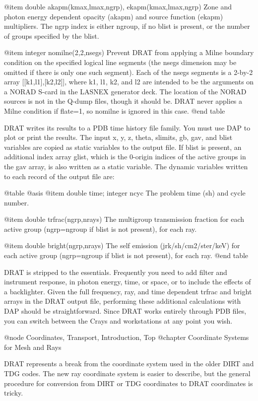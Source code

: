 @item double akapm(kmax,lmax,ngrp), ekapm(kmax,lmax,ngrp)
Zone and photon energy dependent opacity (akapm) and source
function (ekapm) multipliers.  The ngrp index is either
ngroup, if no blist is present, or the number of groups
specified by the blist.

@item integer nomilne(2,2,nsegs)
Prevent DRAT from applying a Milne boundary condition on
the specified logical line segments (the nsegs dimension
may be omitted if there is only one such segment).  Each
of the nsegs segments is a 2-by-2 array [[k1,l1],[k2,l2]],
where k1, l1, k2, and l2 are intended to be the arguments
on a NORAD S-card in the LASNEX generator deck.  The
location of the NORAD sources is not in the Q-dump files,
though it should be.  DRAT never applies a Milne condition
if flate=1, so nomilne is ignored in this case.
@end table

DRAT writes its results to a PDB time history file family.  You must use
DAP to plot or print the results.  The input x, y, z, theta, slimits,
gb, gav, and blist variables are copied as static variables to the
output file.  If blist is present, an additional index array glist,
which is the 0-origin indices of the active groups in the gav array, is
also written as a static variable.  The dynamic variables written to
each record of the output file are:

@table @asis
@item double time; integer ncyc
The problem time (sh) and cycle number.

@item double trfrac(ngrp,nrays)
The multigroup transmission fraction for each active group
(ngrp=ngroup if blist is not present), for each ray.

@item double bright(ngrp,nrays)
The self emission (jrk/sh/cm2/ster/keV) for each active group
(ngrp=ngroup if blist is not present), for each ray.
@end table

DRAT is stripped to the essentials.  Frequently you need to add filter
and instrument response, in photon energy, time, or space, or to include
the effects of a backlighter.  Given the full frequency, ray, and time
dependent trfrac and bright arrays in the DRAT output file, performing
these additional calculations with DAP should be straightforward.  Since
DRAT works entirely through PDB files, you can switch between the Crays
and workstations at any point you wish.

@node Coordinates, Transport, Introduction, Top
@chapter Coordinate Systems for Mesh and Rays

DRAT represents a break from the coordinate system used in the older
DIRT and TDG codes.  The new ray coordinate system is easier to
describe, but the general procedure for conversion from DIRT or TDG
coordinates to DRAT coordinates is tricky.

